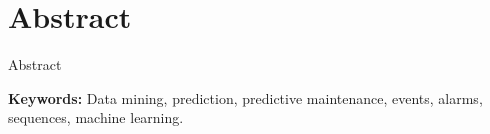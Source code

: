 \chapter*{Abstract}

Abstract

\vfill
\textbf{Keywords:} Data mining, prediction, predictive maintenance, events, alarms, sequences, machine learning.
